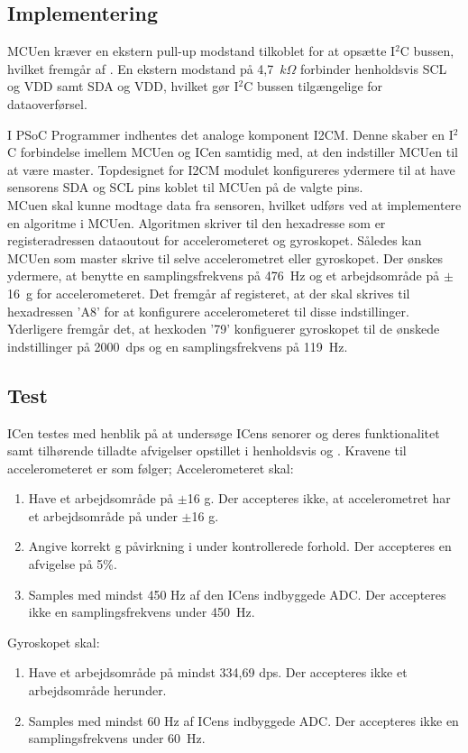 \subsection{Implementering}
MCUen kræver en ekstern pull-up modstand tilkoblet for at opsætte I$^{2}$C bussen, hvilket fremgår af . En ekstern modstand på 4,7~$k\Omega$ forbinder henholdsvis SCL og VDD samt SDA og VDD, hvilket gør I$^{2}$C bussen tilgængelige for dataoverførsel.

I PSoC Programmer indhentes det analoge komponent I2CM. Denne skaber en I$^2$C forbindelse imellem MCUen og ICen samtidig med, at den indstiller MCUen til at være master. %
Topdesignet for I2CM modulet konfigureres ydermere til at have sensorens SDA og SCL pins koblet til MCUen på de valgte pins.\\
MCuen skal kunne modtage data fra sensoren, hvilket udførs ved at implementere en algoritme i MCUen. Algoritmen skriver til den hexadresse som er registeradressen dataoutout for accelerometeret og gyroskopet. Således kan MCUen som master skrive til selve accelerometret eller gyroskopet. Der ønskes ydermere, at benytte en samplingsfrekvens på 476~Hz og et arbejdsområde på $\pm$16~g for accelerometeret. Det fremgår af registeret, at der skal skrives til hexadressen 'A8' for at konfigurere accelerometeret til disse indstillinger. \\
Yderligere fremgår det, at hexkoden '79' konfiguerer gyroskopet til de ønskede indstillinger på 2000~dps og en samplingsfrekvens på 119~Hz. \citep{STMicroelectronics2016}


\subsection{Test}
ICen testes med henblik på at undersøge ICens senorer og deres funktionalitet samt tilhørende tilladte afvigelser opstillet i henholdsvis  og . Kravene til accelerometeret er som følger;
Accelerometeret skal:
\begin{enumerate}
	\item Have et arbejdsområde på $\pm$16 g. Der accepteres ikke, at accelerometret har et arbejdsområde på under $\pm$16 g.
	\item Angive korrekt g påvirkning i under kontrollerede forhold. Der accepteres en afvigelse på 5\%.
	\item Samples med mindst 450 Hz af den ICens indbyggede ADC. Der accepteres ikke en samplingsfrekvens under 450~Hz.
\end{enumerate}
Gyroskopet skal:
\begin{enumerate}
	\item Have et arbejdsområde på mindst 334,69 dps. Der accepteres ikke et arbejdsområde herunder.
	\item Samples med mindst 60 Hz af ICens indbyggede ADC. Der accepteres ikke en samplingsfrekvens under 60~Hz.
\end{enumerate}

